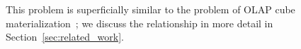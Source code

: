 This problem is superficially similar to the problem of OLAP cube materialization~\cite{olap_cube};
we discuss the relationship in more detail in Section~\ref{sec:related_work}.





  
